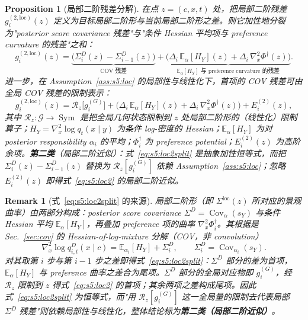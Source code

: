 \documentclass[11pt,a4paper]{article}
\newtheorem{proposition}[theorem]{Proposition}
\newtheorem{remark}[theorem]{Remark}
\DeclareMathOperator{\Cov}{Cov}
\newcommand{\E}{\mathbb{E}}
\newcommand{\cG}{\mathcal{G}}   %
\newcommand{\Rstr}{\mathcal{R}}     %
\newcommand{\Sym}{\operatorname{Sym}}
\begin{document}
\begin{proposition}[局部二阶残差分解]\label{prop:s5:loc2}
在点 $z=(c,x,t)$ 处，把局部二阶残差 $g_i^{(2,\mathrm{loc})}(z)$ 定义为目标局部二阶形与当前局部二阶形之差。则它\emph{加性地}分裂为"posterior score covariance 残差"与"条件 Hessian 平均项与 preference curvature 的残差"之和：
\begin{equation}\label{eq:s5:loc2split}
g_i^{(2,\mathrm{loc})}(z)
=\underbrace{\big(\Sigma_i^D(z)-\Sigma_{i-1}^D(z)\big)}_{\text{COV 残差}}
+\underbrace{\Big(\Delta_i\,\E_{\alpha}[H_Y](z)+\Delta_i\,\nabla_x^2\Phi^\dagger(z)\Big)}_{\text{$\E_\alpha[H_Y]$ 与 preference curvature 的残差}}.
\end{equation}
进一步，在 Assumption~\ref{ass:s5:loc} 的局部性与线性化下，首项的 COV 残差可由全局 COV 残差的限制表示：
\begin{equation}\label{eq:s5:loc2}
g_i^{(2,\mathrm{loc})}(z)
=\Rstr_z\!\big[g_i^{(G)}\big]
+\Big(\Delta_i\,\E_{\alpha}[H_Y](z)+\Delta_i\,\nabla_x^2\Phi^\dagger(z)\Big)
+E_i^{(2)}(z),
\end{equation}
其中 $\Rstr_z:\cG\to\Sym$ 是把全局几何状态限制到 $z$ 处局部二阶形的（线性化）限制算子；$H_Y=\nabla_x^2\log q_t(x\mid y)$ 为条件 log-密度的 Hessian；$\E_\alpha[H_Y]$ 为对 posterior responsibility $\alpha_i$ 的平均；$\Phi_i^\dagger$ 为 preference potential；$E_i^{(2)}(z)$ 为高阶余项。\textbf{第二类}（局部二阶近似）：式~\eqref{eq:s5:loc2split} 是抽象加性\emph{恒等式}，而把 $\Sigma_i^D(z)-\Sigma_{i-1}^D(z)$ 替换为 $\Rstr_z[g_i^{(G)}]$ 依赖 Assumption~\ref{ass:s5:loc}；忽略 $E_i^{(2)}(z)$ 即得式~\eqref{eq:s5:loc2} 的局部二阶近似。
\end{proposition}

\begin{remark}[式~\eqref{eq:s5:loc2split} 的来源]\label{rem:s5:loc2deriv}
局部二阶形（即 $\Sigma^{\mathrm{loc}}(z)$ 所对应的景观曲率）由两部分构成：posterior score covariance $\Sigma^D=\Cov_\alpha(s_Y)$ 与条件 Hessian 平均 $\E_\alpha[H_Y]$，再叠加 preference 项的曲率 $\nabla_x^2\Phi_i^\dagger$。其根据是 Sec.~\ref{sec:cov} 的 Hessian-of-log-mixture 分解（COV，非 convolution）
\begin{equation}\label{eq:s5:hessmix}
\nabla_x^2\log q_{i,t}^D(x\mid c)=\E_{\alpha_i}[H_Y]+\Sigma_i^D,\qquad \Sigma_i^D=\Cov_{\alpha_i}(s_Y).
\end{equation}
对其取第 $i$ 步与第 $i-1$ 步之差即得式~\eqref{eq:s5:loc2split}：$\Sigma^D$ 部分的差为首项，$\E_\alpha[H_Y]$ 与 preference 曲率之差合为尾项。$\Sigma^D$ 部分的全局对应物即 $g_i^{(G)}$，经 $\Rstr_z$ 限制到 $z$ 得式~\eqref{eq:s5:loc2} 的首项；其余两项之差构成尾项。因此式~\eqref{eq:s5:loc2split} 为恒等式，而"用 $\Rstr_z[g_i^{(G)}]$ 这一全局量的限制去代表局部 $\Sigma^D$ 残差"则依赖局部性与线性化，整体结论标为\textbf{第二类（局部二阶近似）}。
\end{remark}
\end{document}
